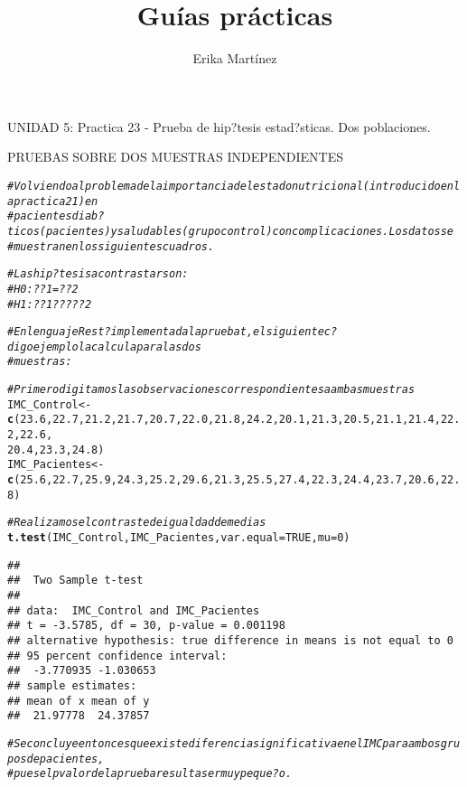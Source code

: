 \documentclass[10pt,a4paper]{article}\usepackage[]{graphicx}\usepackage[]{color}
\author{Erika Martínez}
\title{Guías prácticas}
\makeatletter
\newcommand{\hlnum}[1]{\textcolor[rgb]{0.686,0.059,0.569}{#1}}%
\newcommand{\hlcom}[1]{\textcolor[rgb]{0.678,0.584,0.686}{\textit{#1}}}%
\newcommand{\hlstd}[1]{\textcolor[rgb]{0.345,0.345,0.345}{#1}}%
\newcommand{\hlkwb}[1]{\textcolor[rgb]{0.69,0.353,0.396}{#1}}%
\newcommand{\hlkwc}[1]{\textcolor[rgb]{0.333,0.667,0.333}{#1}}%
\newcommand{\hlkwd}[1]{\textcolor[rgb]{0.737,0.353,0.396}{\textbf{#1}}}%
\newenvironment{kframe}{%
 \def\at@end@of@kframe{}%
 \ifinner\ifhmode%
  \def\at@end@of@kframe{\end{minipage}}%
  \begin{minipage}{\columnwidth}%
 \fi\fi%
 \def\FrameCommand##1{\hskip\@totalleftmargin \hskip-\fboxsep
 \colorbox{shadecolor}{##1}\hskip-\fboxsep
     \hskip-\linewidth \hskip-\@totalleftmargin \hskip\columnwidth}%
 \MakeFramed {\advance\hsize-\width
   \@totalleftmargin\z@ \linewidth\hsize
   \@setminipage}}%
 {\par\unskip\endMakeFramed%
 \at@end@of@kframe}
\newenvironment{knitrout}{}{} %
\makeatother
\begin{document}
\maketitle
\newpage


UNIDAD 5: Practica 23 - Prueba de hip?tesis estad?sticas. Dos poblaciones. 

PRUEBAS SOBRE DOS MUESTRAS INDEPENDIENTES

\begin{knitrout}
\color{fgcolor}\begin{kframe}
\begin{alltt}
\hlcom{#Volviendo al problema de la importancia del estadonutricional (introducido en la practica 21) en }
\hlcom{#pacientes diab?ticos (pacientes) y saludables (grupo control) con complicaciones. Los datos se }
\hlcom{#muestran en los siguientes cuadros.}

\hlcom{#Las hip?tesis a contrastar son:}
\hlcom{#H0:??1=??2}
\hlcom{#H1:??1?????2}

\hlcom{#En lenguaje R est? implementada la prueba t, el siguiente c?digo ejemplo la calcula para las dos }
\hlcom{#muestras:}

\hlcom{# Primero digitamos las observaciones correspondientes a ambas muestras }
\hlstd{IMC_Control} \hlkwb{<-} \hlkwd{c}\hlstd{(}\hlnum{23.6}\hlstd{,} \hlnum{22.7}\hlstd{,} \hlnum{21.2}\hlstd{,} \hlnum{21.7}\hlstd{,} \hlnum{20.7}\hlstd{,} \hlnum{22.0}\hlstd{,} \hlnum{21.8}\hlstd{,} \hlnum{24.2}\hlstd{,} \hlnum{20.1}\hlstd{,} \hlnum{21.3}\hlstd{,} \hlnum{20.5}\hlstd{,} \hlnum{21.1}\hlstd{,} \hlnum{21.4}\hlstd{,} \hlnum{22.2}\hlstd{,} \hlnum{22.6}\hlstd{,}
                 \hlnum{20.4}\hlstd{,} \hlnum{23.3}\hlstd{,} \hlnum{24.8}\hlstd{)}
\hlstd{IMC_Pacientes} \hlkwb{<-} \hlkwd{c}\hlstd{(}\hlnum{25.6}\hlstd{,} \hlnum{22.7}\hlstd{,} \hlnum{25.9}\hlstd{,} \hlnum{24.3}\hlstd{,} \hlnum{25.2}\hlstd{,} \hlnum{29.6}\hlstd{,} \hlnum{21.3}\hlstd{,} \hlnum{25.5}\hlstd{,} \hlnum{27.4}\hlstd{,} \hlnum{22.3}\hlstd{,} \hlnum{24.4}\hlstd{,} \hlnum{23.7}\hlstd{,} \hlnum{20.6}\hlstd{,} \hlnum{22.8}\hlstd{)}

\hlcom{# Realizamos el contraste de igualdad de medias }
\hlkwd{t.test}\hlstd{(IMC_Control, IMC_Pacientes,} \hlkwc{var.equal}\hlstd{=}\hlnum{TRUE}\hlstd{,} \hlkwc{mu}\hlstd{=}\hlnum{0}\hlstd{)}
\end{alltt}
\begin{verbatim}
## 
## 	Two Sample t-test
## 
## data:  IMC_Control and IMC_Pacientes
## t = -3.5785, df = 30, p-value = 0.001198
## alternative hypothesis: true difference in means is not equal to 0
## 95 percent confidence interval:
##  -3.770935 -1.030653
## sample estimates:
## mean of x mean of y 
##  21.97778  24.37857
\end{verbatim}
\begin{alltt}
\hlcom{#Se concluye entonces que existe diferencia significativa en el IMC para ambos grupos de pacientes, }
\hlcom{#pues el p valor de la prueba resulta ser muy peque?o.}


\end{alltt}
\end{kframe}
\end{knitrout}
\end{document}
